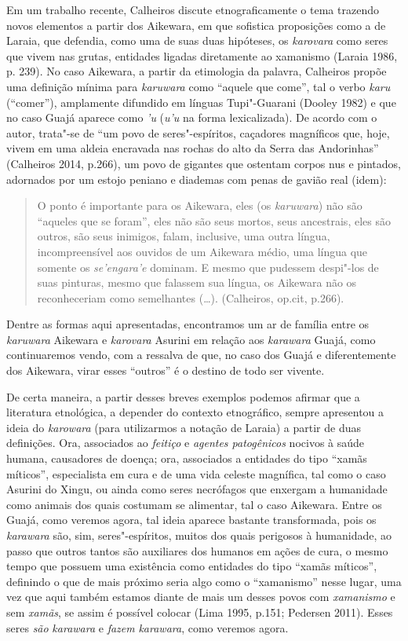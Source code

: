 Em um trabalho recente, Calheiros discute etnograficamente o tema
trazendo novos elementos a partir dos Aikewara, em que sofistica
proposições como a de Laraia, que defendia, como uma de suas duas
hipóteses, os \emph{karovara} como seres que vivem nas grutas, entidades
ligadas diretamente ao xamanismo (Laraia 1986, p. 239). No caso
Aikewara, a partir da etimologia da palavra, Calheiros propõe uma
definição mínima para \emph{karuwara} como ``aquele que come'', tal o
verbo \emph{karu} (``comer''), amplamente difundido em línguas
Tupi"-Guarani (Dooley 1982) e que no caso Guajá aparece como \emph{'u}
(\emph{u'u} na forma lexicalizada). De acordo com o autor, trata"-se de
``um povo de seres"-espíritos, caçadores magníficos que, hoje, vivem em
uma aldeia encravada nas rochas do alto da Serra das Andorinhas''
(Calheiros 2014, p.266), um povo de gigantes que ostentam corpos nus e
pintados, adornados por um estojo peniano e diademas com penas de gavião
real (idem):

\begin{quote}
O ponto é importante para os Aikewara, eles (os \emph{karuwara}) não
são ``aqueles que se foram'', eles não são seus mortos, seus ancestrais,
eles são outros, são seus inimigos, falam, inclusive, uma outra língua,
incompreensível aos ouvidos de um Aikewara médio, uma língua que somente
os \emph{se'engara'e} dominam. E mesmo que pudessem despi"-los de suas
pinturas, mesmo que falassem sua língua, os Aikewara não os
reconheceriam como semelhantes (\ldots{}). (Calheiros, op.cit, p.266).
\end{quote}

Dentre as formas aqui apresentadas, encontramos um ar de família entre
os \emph{karuwara} Aikewara e \emph{karovara} Asurini em relação aos
\emph{karawara} Guajá, como continuaremos vendo, com a ressalva de que,
no caso dos Guajá e diferentemente dos Aikewara, virar esses ``outros''
é o destino de todo ser vivente.

De certa maneira, a partir desses breves exemplos podemos afirmar que a
literatura etnológica, a depender do contexto etnográfico, sempre
apresentou a ideia do \emph{karowara} (para utilizarmos a notação de
Laraia) a partir de duas definições. Ora, associados ao \emph{feitiço} e
\emph{agentes patogênicos} nocivos à saúde humana, causadores de doença;
ora, associados a entidades do tipo ``xamãs míticos'', especialista em
cura e de uma vida celeste magnífica, tal como o caso Asurini do Xingu,
ou ainda como seres necrófagos que enxergam a humanidade como animais
dos quais costumam se alimentar, tal o caso Aikewara. Entre os Guajá,
como veremos agora, tal ideia aparece bastante transformada, pois os
\emph{karawara} são, sim, seres"-espíritos, muitos dos quais perigosos à
humanidade, ao passo que outros tantos são auxiliares dos humanos em
ações de cura, o mesmo tempo que possuem uma existência como entidades
do tipo ``xamãs míticos'', definindo o que de mais próximo seria algo como
o ``xamanismo'' nesse lugar, uma vez que aqui também estamos diante de
mais um desses povos com \emph{xamanismo} e sem \emph{xamãs}, se assim é
possível colocar (Lima 1995, p.151; Pedersen 2011). Esses seres
\emph{são} \emph{karawara} e \emph{fazem} \emph{karawara}, como veremos
agora.

